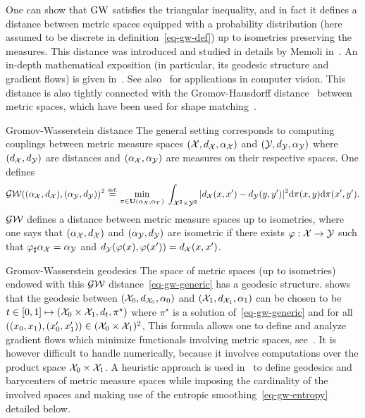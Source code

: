 One can show that $\operatorname{\mathrm{GW}}$ satisfies the triangular inequality, and in fact it defines a distance between metric spaces equipped with a probability distribution (here assumed to be discrete in definition~\eqref{eq-gw-def}) up to isometries preserving the measures.
%
This distance was introduced and studied in details by Memoli in~\cite{memoli-2011}. An in-depth mathematical exposition (in particular, its geodesic structure and gradient flows) is given in~\cite{SturmGW}. See also~\cite{schmitzer2013modelling} for applications in computer vision.
%
This distance is also tightly connected with the Gromov-Hausdorff distance~\cite{gromov-2001} between metric spaces, which have been used for shape matching~\cite{memoli-2007,bronstein-2010}. 



\begin{rem}{Gromov-Wasserstein distance}
	The general setting corresponds to computing couplings between metric measure spaces $(\mathcal{X},d_{\mathcal{X}},\alpha_{\mathcal{X}})$
	and $(\mathcal{Y},d_{\mathcal{Y}},\alpha_{\mathcal{Y}})$ where $(d_{\mathcal{X}},d_{\mathcal{Y}})$ are distances and $(\alpha_{\mathcal{X}},\alpha_{\mathcal{Y}})$ are measures on their respective spaces.
	One defines 
	\begin{align}
		\label{eq-gw-generic}
		\operatorname{\mathcal{GW}}( (\alpha_{\mathcal{X}},d_{\mathcal{X}}), (\alpha_{\mathcal{Y}},d_{\mathcal{Y}}) )^2 \stackrel{\mbox{\upshape\tiny def.}}{=} 
		\underset{ \pi \in \mathrm{\textbf{\upshape U}}(\alpha_{\mathcal{X}},\alpha_Y) }{\min}\; 
		\int_{\mathcal{X}^2 \times \mathcal{Y}^2}
		| d_{\mathcal{X}}(x,x')-d_{\mathcal{Y}}(y,y') |^2
		\mathrm{d}\pi(x,y)\mathrm{d}\pi(x',y').
	\end{align}
	$\operatorname{\mathcal{GW}}$ defines a distance between metric measure spaces up to isometries, where one says that $(\alpha_{\mathcal{X}},d_{\mathcal{X}})$ and $(\alpha_{\mathcal{Y}},d_{\mathcal{Y}}) $ are isometric if there exists $\varphi : \mathcal{X} \rightarrow \mathcal{Y}$ such that $\varphi_{\sharp}\alpha_{\mathcal{X}}=\alpha_{\mathcal{Y}}$ and $d_{\mathcal{Y}}(\varphi(x),\varphi(x'))=d_{\mathcal{X}}(x,x')$.
\end{rem}



\begin{rem}{Gromov-Wasserstein geodesics}
The space of metric spaces (up to isometries) endowed with this $\operatorname{\mathcal{GW}}$ distance~\eqref{eq-gw-generic} has a geodesic structure. \cite{SturmGW} shows that the geodesic between  $(\mathcal{X}_0,d_{\mathcal{X}_0},\alpha_0)$ and $(\mathcal{X}_1,d_{\mathcal{X}_1},\alpha_1)$ can be chosen to be 
$t \in [0,1] \mapsto (\mathcal{X}_0 \times \mathcal{X}_1,d_t,\pi^\star)$ where $\pi^\star$ is a solution of~\eqref{eq-gw-generic} and for all $((x_0,x_1), (x_0',x_1')) \in (\mathcal{X}_0 \times \mathcal{X}_1)^2$, 
This formula allows one to define and analyze gradient flows which minimize functionals involving metric spaces, see~\cite{SturmGW}. It is however difficult to handle numerically, because it involves computations over the product space $\mathcal{X}_0 \times \mathcal{X}_1$. 
%
A heuristic approach is used in~\cite{peyre2016gromov} to define geodesics and barycenters of metric measure spaces while imposing the cardinality of the involved spaces and making use of the entropic smoothing~\eqref{eq-gw-entropy} detailed below.
\end{rem}

